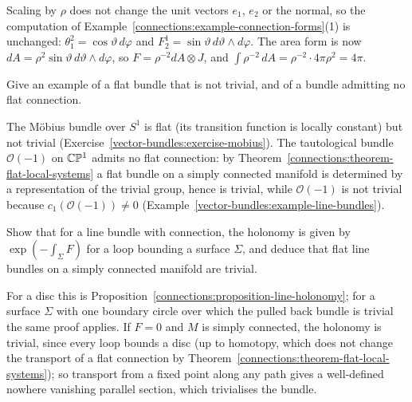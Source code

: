 \begin{solution}
Scaling by $\rho$ does not change the unit vectors $e_1$, $e_2$ or the normal, so the computation of Example~\ref{connections:example-connection-forms}(1) is unchanged:
$\theta^2_1 = \cos\vartheta\,d\varphi$ and $F^1_2 = \sin\vartheta\,d\vartheta \wedge d\varphi$. The area form is now $dA = \rho^2\sin\vartheta\,d\vartheta \wedge d\varphi$, so
$F = \rho^{-2}dA \otimes J$, and $\int\rho^{-2}\,dA = \rho^{-2} \cdot 4\pi\rho^2 = 4\pi$.
\end{solution}

\begin{exercise}\label{connections:exercise-flat-not-trivial}
Give an example of a flat bundle that is not trivial, and of a bundle admitting no flat connection.
\end{exercise}

\begin{solution}
The M\"obius bundle over $S^1$ is flat (its transition function is locally constant) but not trivial
(Exercise~\ref{vector-bundles:exercise-mobius}). The tautological bundle $\mathcal{O}(-1)$ on $\mathbb{C}\mathbb{P}^1$ admits no flat connection: by Theorem~\ref{connections:theorem-flat-local-systems} a flat bundle on a
simply connected manifold is determined by a representation of the trivial group, hence is trivial, while $\mathcal{O}(-1)$ is not trivial because $c_1(\mathcal{O}(-1)) \neq 0$
(Example~\ref{vector-bundles:example-line-bundles}).
\end{solution}

\begin{exercise}\label{connections:exercise-holonomy-abelian}
Show that for a line bundle with connection, the holonomy is given by $\exp(-\int_\Sigma F)$ for a loop bounding a surface $\Sigma$, and deduce that flat line bundles on a simply connected manifold are
trivial.
\end{exercise}

\begin{solution}
For a disc this is Proposition~\ref{connections:proposition-line-holonomy}; for a surface $\Sigma$ with one boundary circle over which the pulled back bundle is trivial the same
proof applies. If $F = 0$ and $M$ is simply connected, the holonomy is trivial, since every loop bounds a disc (up to homotopy, which does not change the transport of a flat
connection by Theorem~\ref{connections:theorem-flat-local-systems}); so transport from a fixed point along any path gives a well-defined nowhere vanishing parallel section, which
trivialises the bundle.
\end{solution}

